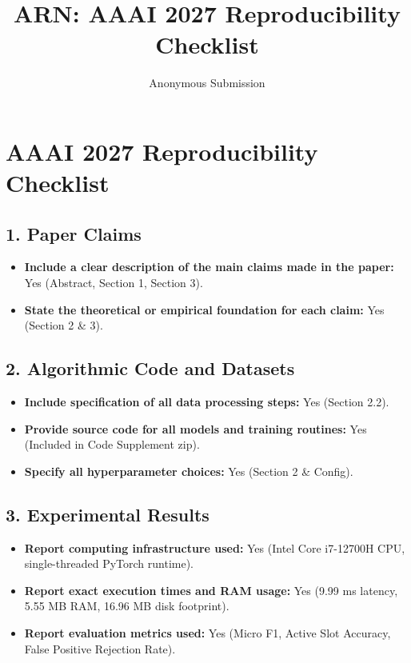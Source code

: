 \documentclass[letterpaper]{article}
\title{ARN: AAAI 2027 Reproducibility Checklist}
\author{Anonymous Submission}
\begin{document}
\maketitle

\section*{AAAI 2027 Reproducibility Checklist}

\subsection*{1. Paper Claims}
\begin{itemize}
    \item \textbf{Include a clear description of the main claims made in the paper:} Yes (Abstract, Section 1, Section 3).
    \item \textbf{State the theoretical or empirical foundation for each claim:} Yes (Section 2 \& 3).
\end{itemize}

\subsection*{2. Algorithmic Code and Datasets}
\begin{itemize}
    \item \textbf{Include specification of all data processing steps:} Yes (Section 2.2).
    \item \textbf{Provide source code for all models and training routines:} Yes (Included in Code Supplement zip).
    \item \textbf{Specify all hyperparameter choices:} Yes (Section 2 \& Config).
\end{itemize}

\subsection*{3. Experimental Results}
\begin{itemize}
    \item \textbf{Report computing infrastructure used:} Yes (Intel Core i7-12700H CPU, single-threaded PyTorch runtime).
    \item \textbf{Report exact execution times and RAM usage:} Yes (9.99 ms latency, 5.55 MB RAM, 16.96 MB disk footprint).
    \item \textbf{Report evaluation metrics used:} Yes (Micro F1, Active Slot Accuracy, False Positive Rejection Rate).
\end{itemize}
\end{document}
